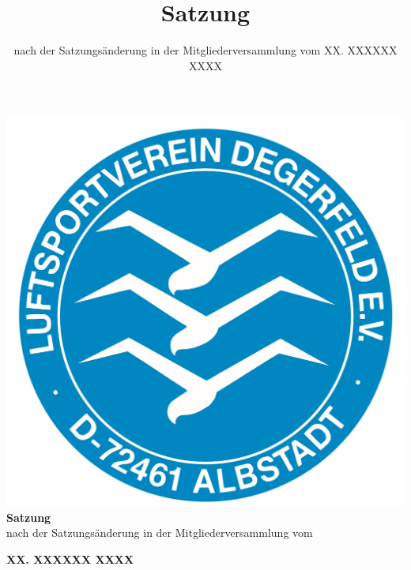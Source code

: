 \documentclass[10pt,a4paper,parskip=half]{scrartcl}
\title{Satzung}
\subtitle{nach der Satzungsänderung in der Mitgliederversammlung vom XX. XXXXXX XXXX} %
\providecommand{\DIFaddbegin}{} %
\providecommand{\DIFaddend}{} %
\providecommand{\DIFdelbegin}{} %
\providecommand{\DIFdelend}{} %
\newcommand{\DIFscaledelfig}{0.5}
\newlength{\DIFdelgraphicswidth} %
\newlength{\DIFdelgraphicsheight} %
\newcommand{\DIFaddincludegraphics}[2][]{{\color{blue}\fbox{\DIFOincludegraphics[#1]{#2}}}} %
\newcommand{\DIFdelincludegraphics}[2][]{%
\sbox{\DIFdelgraphicsbox}{\DIFOincludegraphics[#1]{#2}}%
\settoboxwidth{\DIFdelgraphicswidth}{\DIFdelgraphicsbox} %
\settoboxtotalheight{\DIFdelgraphicsheight}{\DIFdelgraphicsbox} %
\scalebox{\DIFscaledelfig}{%
\parbox[b]{\DIFdelgraphicswidth}{\usebox{\DIFdelgraphicsbox}\\[-\baselineskip] \rule{\DIFdelgraphicswidth}{0em}}\llap{\resizebox{\DIFdelgraphicswidth}{\DIFdelgraphicsheight}{%
\setlength{\unitlength}{\DIFdelgraphicswidth}%
\begin{picture}(1,1)%
\thicklines\linethickness{2pt} %
{\color[rgb]{1,0,0}\put(0,0){\framebox(1,1){}}}%
{\color[rgb]{1,0,0}\put(0,0){\line( 1,1){1}}}%
{\color[rgb]{1,0,0}\put(0,1){\line(1,-1){1}}}%
\end{picture}%
}\hspace*{3pt}}} %
} %
\DeclareRobustCommand{\DIFaddbegin}{\DIFOaddbegin \let\includegraphics\DIFaddincludegraphics} %
\DeclareRobustCommand{\DIFaddend}{\DIFOaddend \let\includegraphics\DIFOincludegraphics} %
\DeclareRobustCommand{\DIFdelbegin}{\DIFOdelbegin \let\includegraphics\DIFdelincludegraphics} %
\DeclareRobustCommand{\DIFdelend}{\DIFOaddend \let\includegraphics\DIFOincludegraphics} %
\begin{document}
\thispagestyle{plain}
\begin{center}
  \includegraphics[scale=0.2]{Logo.png}\\[5ex]

  \Huge{\textbf{Satzung}}\\[1.5ex]
  \large{nach der Satzungsänderung in der Mitgliederversammlung vom}\\[1.5ex]

  \normalsize

  \textbf{\DIFdelbegin %
\DIFdelend \DIFaddbegin \Large{XX. XXXXXX XXXX}\DIFaddend }\\

\end{center}
\end{document}
